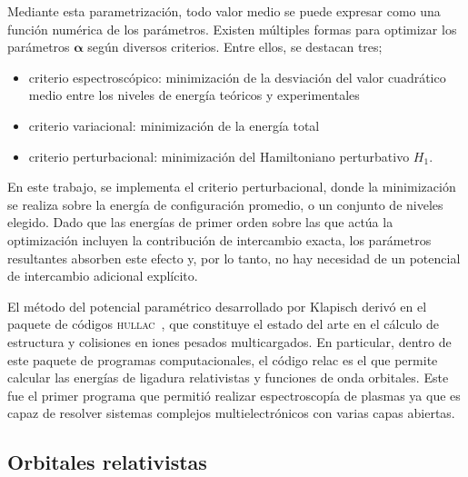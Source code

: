 Mediante esta parametrización, todo valor medio se puede expresar como 
una función numérica de los parámetros. Existen múltiples formas 
para optimizar los parámetros $\boldsymbol{\alpha}$ según diversos 
criterios. Entre ellos, se destacan tres;
\begin{itemize}
\item criterio espectroscópico: minimización de la desviación del valor 
cuadrático medio entre los niveles de energía teóricos y experimentales
\item criterio variacional: minimización de la energía total
\item criterio perturbacional: minimización del Hamiltoniano perturbativo
$H_1$. 
\end{itemize}
En este trabajo, se implementa el criterio perturbacional, donde la 
minimización se realiza sobre la energía de configuración promedio, o 
un conjunto de niveles elegido. Dado que las energías de primer orden 
sobre las que actúa la optimización incluyen la contribución de 
intercambio exacta, los parámetros resultantes absorben este efecto y, 
por lo tanto, no hay necesidad de un potencial de intercambio adicional 
explícito.

El método del potencial paramétrico desarrollado por Klapisch derivó en
el paquete de códigos \textsc{hullac}~\cite{BarShalom:01}, que constituye 
el estado del arte en el cálculo de estructura y colisiones en iones 
pesados multicargados. En particular, dentro de este paquete de 
programas computacionales, el código 
{\sc relac} es el que permite calcular las energías de ligadura 
relativistas y funciones de onda orbitales. Este fue 
el primer programa que permitió realizar espectroscopía de plasmas ya 
que es capaz de resolver sistemas complejos multielectrónicos con varias 
capas abiertas. 

\subsection{Orbitales relativistas}

